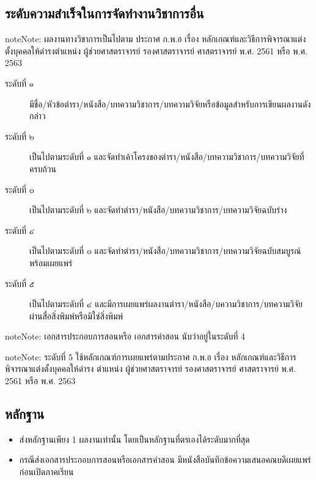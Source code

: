 \documentclass[a4paper,12pt,english]{sphinxmanual}
\begin{document}
\subsection{ระดับความสำเร็จในการจัดทำงานวิชาการอื่น}
\label{\detokenize{submission_part1:id9}}
\begin{sphinxadmonition}{note}{Note:}
ผลงานทางวิชาการเป็นไปตาม ประกาศ ก.พ.อ เรื่อง หลักเกณฑ์และวิธีการพิจารณาแต่งตั้งบุคคลให้ดำรงตำแหน่ง ผู้ช่วยศาสตราจารย์ รองศาสตราจารย์ ศาสตราจารย์ พ.ศ. 2561 หรือ พ.ศ. 2563
\end{sphinxadmonition}
\begin{description}
\item[{ระดับที่ ๑}] \leavevmode
มีชื่อ/หัวข้อตำรา/หนังสือ/บทความวิชาการ/บทความวิจัยหรือข้อมูลสำหรับการเขียนผลงานดังกล่าว

\item[{ระดับที่ ๒}] \leavevmode
เป็นไปตามระดับที่ ๑ และจัดทำเค้าโครงของตำรา/หนังสือ/บทความวิชาการ/บทความวิจัยที่ครบถ้วน

\item[{ระดับที่ ๓}] \leavevmode
เป็นไปตามระดับที่ ๒ และจัดทำตำรา/หนังสือ/บทความวิชาการ/บทความวิจัยฉบับร่าง

\item[{ระดับที่ ๔}] \leavevmode
เป็นไปตามระดับที่ ๓ และจัดทำตำรา/หนังสือ/บทความวิชาการ/บทความวิจัยฉบับสมบูรณ์พร้อมเผยแพร่

\item[{ระดับที่ ๕}] \leavevmode
เป็นไปตามระดับที่ ๔ และมีการเผยแพร่ผลงานตำรา/หนังสือ/บความวิชาการ/บทความวิจัยผ่านสื่อสิ่งพิมพ์หรือมิใช่สิ่งพิมพ์

\end{description}

\begin{sphinxadmonition}{note}{Note:}
เอกสารประกอบการสอนหรือ เอกสารคำสอน นับว่าอยู่ในระดับที่ 4
\end{sphinxadmonition}

\begin{sphinxadmonition}{note}{Note:}
ระดับที่ 5 ใช้หลักเกณฑ์การเผยแพร่ตามประกาศ ก.พ.อ เรื่อง หลักเกณฑ์และวิธีการพิจารณาแต่งตั้งบุคคลให้ดำรง ตำแหน่ง ผู้ช่วยศาสตราจารย์
รองศาสตราจารย์ ศาสตราจารย์ พ.ศ. 2561 หรือ พ.ศ. 2563
\end{sphinxadmonition}


\subsection{หลักฐาน}
\label{\detokenize{submission_part1:id10}}\begin{itemize}
\item {} 
ส่งหลักฐานเพียง 1 ผลงานเท่านั้น โดยเป็นหลักฐานที่ตรเองได้ระดับมากที่สุด

\item {} 
กรณีส่งเอกสารประกอบการสอนหรือเอกสารคำสอน  มีหนังสือบันทึกข้อความเสนอคณบดีเผยแพร่ก่อนเปิดภาคเรียน

\end{itemize}
\end{document}
